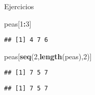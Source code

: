 \documentclass[ignorenonframetext,]{beamer}
\newenvironment{Shaded}{\begin{snugshade}}{\end{snugshade}}
\newcommand{\KeywordTok}[1]{\textcolor[rgb]{0.13,0.29,0.53}{\textbf{#1}}}
\newcommand{\DecValTok}[1]{\textcolor[rgb]{0.00,0.00,0.81}{#1}}
\newcommand{\StringTok}[1]{\textcolor[rgb]{0.31,0.60,0.02}{#1}}
\newcommand{\OperatorTok}[1]{\textcolor[rgb]{0.81,0.36,0.00}{\textbf{#1}}}
\newcommand{\NormalTok}[1]{#1}
\begin{document}
\begin{frame}[fragile]{Ejercicios}

\begin{Shaded}
\begin{Highlighting}[]
\NormalTok{peas[}\DecValTok{1}\OperatorTok{:}\DecValTok{3}\NormalTok{]}
\end{Highlighting}
\end{Shaded}
\pause
\begin{verbatim}
## [1] 4 7 6
\end{verbatim}

\begin{Shaded}
\begin{Highlighting}[]
\NormalTok{peas[}\KeywordTok{seq}\NormalTok{(}\DecValTok{2}\NormalTok{,}\KeywordTok{length}\NormalTok{(peas),}\DecValTok{2}\NormalTok{)]}
\end{Highlighting}
\end{Shaded}
\pause
\begin{verbatim}
## [1] 7 5 7
\end{verbatim}

\begin{Shaded}
\end{Shaded}
\pause
\begin{verbatim}
## [1] 7 5 7
\end{verbatim}

\end{frame}
\end{document}
